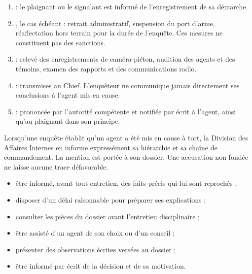 \begin{enumerate}
  \item {} : le plaignant ou le signalant est informé de l'enregistrement de sa démarche.
  \item {}, le cas échéant : retrait administratif, suspension du port d'arme, réaffectation hors terrain pour la durée de l'enquête. Ces mesures ne constituent pas des sanctions.
  \item {} : relevé des enregistrements de caméra-piéton, audition des agents et des témoins, examen des rapports et des communications radio.
  \item {} : transmises au Chief. L'enquêteur ne communique jamais directement ses conclusions à l'agent mis en cause.
  \item {} : prononcée par l'autorité compétente et notifiée par écrit à l'agent, ainsi qu'au plaignant dans son principe.
\end{enumerate}



\begin{rappel}
Lorsqu'une enquête établit qu'un agent a été mis en cause à tort, la Division des Affaires Internes en informe expressément sa hiérarchie et sa chaîne de commandement. La mention est portée à son dossier. Une accusation non fondée ne laisse aucune trace défavorable.
\end{rappel}


\begin{itemize}
  \item être informé, avant tout entretien, des faits précis qui lui sont reprochés ;
  \item disposer d'un délai raisonnable pour préparer ses explications ;
  \item consulter les pièces du dossier avant l'entretien disciplinaire ;
  \item être assisté d'un agent de son choix ou d'un conseil ;
  \item présenter des observations écrites versées au dossier ;
  \item être informé par écrit de la décision et de sa motivation.
\end{itemize}

